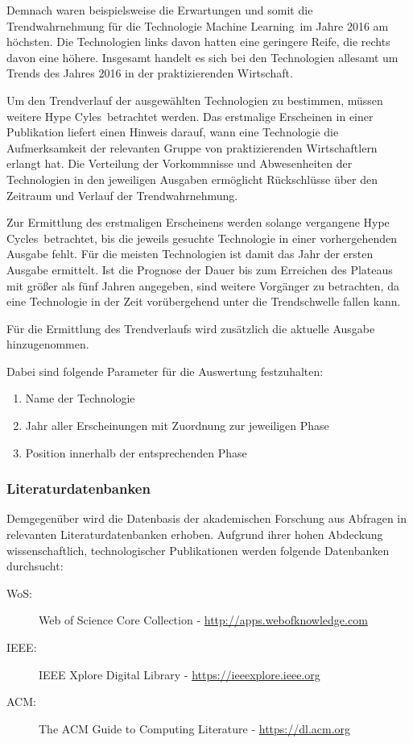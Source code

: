 Demnach waren beispielsweise die Erwartungen und somit die Trendwahrnehmung für die Technologie \glqq Machine Learning\grqq~im Jahre 2016 am höchsten. Die Technologien links davon hatten eine geringere Reife, die rechts davon eine höhere. Insgesamt handelt es sich bei den Technologien allesamt um Trends des Jahres 2016 in der praktizierenden Wirtschaft.

Um den Trendverlauf der ausgewählten Technologien zu bestimmen, müssen weitere \glqq Hype Cyles\grqq~betrachtet werden. Das erstmalige Erscheinen in einer Publikation liefert einen Hinweis darauf, wann eine Technologie die Aufmerksamkeit der relevanten Gruppe von praktizierenden Wirtschaftlern erlangt hat. Die Verteilung der Vorkommnisse und Abwesenheiten der Technologien in den jeweiligen Ausgaben ermöglicht Rückschlüsse über den Zeitraum und Verlauf der Trendwahrnehmung.

Zur Ermittlung des erstmaligen Erscheinens werden solange vergangene \glqq Hype Cycles\grqq~betrachtet, bis die jeweils gesuchte Technologie in einer vorhergehenden Ausgabe fehlt. Für die meisten Technologien ist damit das Jahr der ersten Ausgabe ermittelt. Ist die Prognose der Dauer bis zum Erreichen des \glqq Plateaus\grqq~ mit größer als fünf Jahren angegeben, sind weitere Vorgänger zu betrachten, da eine Technologie in der Zeit vorübergehend unter die Trendschwelle fallen kann.

Für die Ermittlung des Trendverlaufs wird zusätzlich die aktuelle Ausgabe hinzugenommen.

Dabei sind folgende Parameter für die Auswertung festzuhalten:

\begin{enumerate}
	\item Name der Technologie
	\item Jahr aller Erscheinungen mit Zuordnung zur jeweiligen Phase
	\item Position innerhalb der entsprechenden Phase
\end{enumerate}

\subsubsection{Literaturdatenbanken}\label{sec:lit_data}
Demgegenüber wird die Datenbasis der akademischen Forschung aus Abfragen in relevanten Literaturdatenbanken erhoben. Aufgrund ihrer hohen Abdeckung wissenschaftlich, technologischer Publikationen werden folgende Datenbanken durchsucht:
\begin{description}
	\item [WoS:] Web of Science Core Collection - \url{http://apps.webofknowledge.com}
	\item [IEEE:] IEEE Xplore Digital Library - \url{https://ieeexplore.ieee.org}
	\item [ACM:] The ACM Guide to Computing Literature - \url{https://dl.acm.org}
\end{description}

